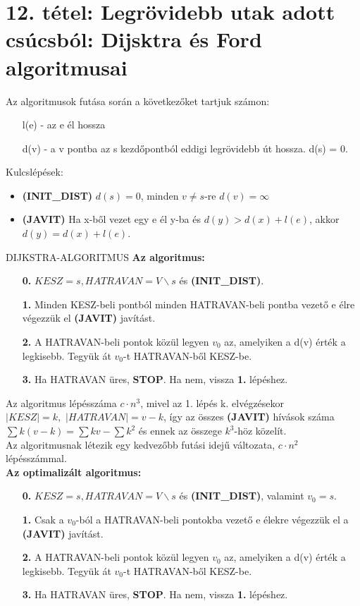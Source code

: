 \section{12. tétel: Legrövidebb utak adott csúcsból: Dijsktra és Ford algoritmusai}

Az algoritmusok futása során a következőket tartjuk számon:

\begin{itemize}
\item[] l(e) - az e él hossza
\item[] d(v) - a v pontba az s kezdőpontból eddigi legrövidebb út hossza. d(s) = 0.
\end{itemize}
Kulcslépések:
\begin{itemize}
\item \textbf{(INIT\_DIST)} $d(s) = 0$, minden $v \neq s$-re $d(v) = \infty$
\item \textbf{(JAVIT)} Ha x-ből vezet egy e él y-ba és $d(y) > d(x) + l(e)$, akkor $d(y) = d(x) + l(e)$.
\end{itemize}

\begin{tetel}{DIJKSTRA-ALGORITMUS}
\textbf{Az algoritmus:}
\begin{itemize}
\item[\textbf{0.}] $KESZ = {s}, HATRAVAN = V\backslash {s}$ és \textbf{(INIT\_DIST)}.
\item[\textbf{1.}] Minden KESZ-beli pontból minden HATRAVAN-beli pontba vezető e élre végezzük el \textbf{(JAVIT)} javítást.
\item[\textbf{2.}] A HATRAVAN-beli pontok közül legyen $v_0$ az, amelyiken a d(v) érték a legkisebb. Tegyük át $v_0$-t HATRAVAN-ből KESZ-be.
\item[\textbf{3.}] Ha HATRAVAN üres, \textbf{STOP}. Ha nem, vissza \textbf{1.} lépéshez.
\end{itemize}
Az algoritmus lépésszáma $c\cdot n^3$, mivel az 1. lépés k. elvégzésekor $|KESZ| = k,\,\, |HATRAVAN| = v - k$, így az összes \textbf{(JAVIT)} hívások száma $\sum k(v-k) = \sum kv - \sum k^2$ és ennek az összege $k^3$-höz közelít.\\Az algoritmusnak létezik egy kedvezőbb futási idejű változata, $c\cdot n^2$ lépésszámmal.\\
\textbf{Az optimalizált algoritmus:}
\begin{itemize}
\item[\textbf{0.}] $KESZ = {s}, HATRAVAN = V\backslash {s}$ és \textbf{(INIT\_DIST)}, valamint $v_0 = s$.
\item[\textbf{1.}] Csak a $v_0$-ból a HATRAVAN-beli pontokba vezető e élekre végezzük el a \textbf{(JAVIT)} javítást.
\item[\textbf{2.}] A HATRAVAN-beli pontok közül legyen $v_0$ az, amelyiken a d(v) érték a legkisebb. Tegyük át $v_0$-t HATRAVAN-ből KESZ-be.
\item[\textbf{3.}] Ha HATRAVAN üres, \textbf{STOP}. Ha nem, vissza \textbf{1.} lépéshez.
\end{itemize}
\end{tetel}

